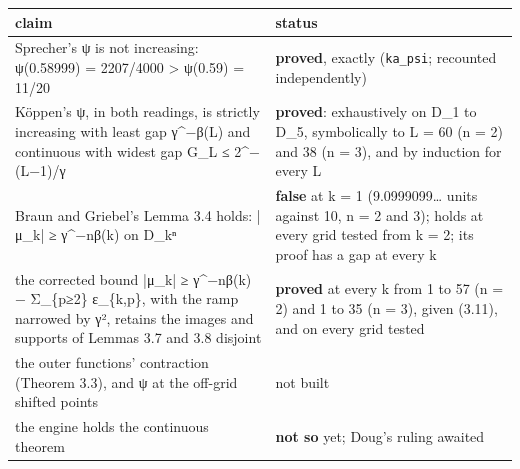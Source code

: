 {\small
\setlength{\tabcolsep}{6pt}
\begin{longtable}{>{\RaggedRight\arraybackslash}p{}>{\RaggedRight\arraybackslash}p{}}
\toprule
claim & status \\
\midrule
\endhead
Sprecher's ψ is not increasing: ψ(0.58999) = 2207/4000 > ψ(0.59) = 11/20 & \textbf{proved}, exactly (\texttt{ka\_\allowbreak{}psi}; recounted independently) \\
Köppen's ψ, in both readings, is strictly increasing with least gap γ\textasciicircum{}−β(L) and continuous with widest gap G\_\allowbreak{}L ≤ 2\textasciicircum{}−(L−1)/γ & \textbf{proved}: exhaustively on D\_\allowbreak{}1 to D\_\allowbreak{}5, symbolically to L = 60 (n = 2) and 38 (n = 3), and by induction for every L \\
Braun and Griebel's Lemma 3.4 holds: |μ\_\allowbreak{}k| ≥ γ\textasciicircum{}−nβ(k) on D\_\allowbreak{}kⁿ & \textbf{false} at k = 1 (9.0999099… units against 10, n = 2 and 3); holds at every grid tested from k = 2; its proof has a gap at every k \\
the corrected bound |μ\_\allowbreak{}k| ≥ γ\textasciicircum{}−nβ(k) − Σ\_\allowbreak{}\{p≥2\} ε\_\allowbreak{}\{k,p\}, with the ramp narrowed by γ², retains the images and supports of Lemmas 3.7 and 3.8 disjoint & \textbf{proved} at every k from 1 to 57 (n = 2) and 1 to 35 (n = 3), given (3.11), and on every grid tested \\
the outer functions' contraction (Theorem 3.3), and ψ at the off-grid shifted points & not built \\
the engine holds the continuous theorem & \textbf{not so} yet; Doug's ruling awaited \\
\bottomrule
\end{longtable}
}
